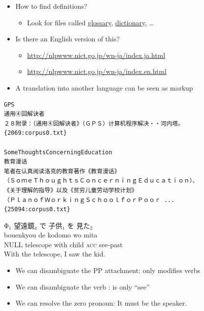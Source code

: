 \documentclass[a4paper,landscape,headrule,footrule,xetex]{foils}
\begin{document}
 \begin{itemize}
 \item How to find definitions?
   \begin{itemize}
   \item Look for files called \url{glossary}, \url{dictionary}, \ldots
   \end{itemize}
 \item Is there an English version of this?
   \begin{itemize}
   \item \url{http://nlpwww.nict.go.jp/wn-ja/index.ja.html}
   \item \url{http://nlpwww.nict.go.jp/wn-ja/index.en.html}
   \end{itemize}
 \end{itemize}


 \begin{itemize}
 \item A translation into another language can be seen as markup
 \end{itemize}

\begin{verbatim}
GPS	
通用④回解诀者
２８附录：（通用④回解诀者》（ＧＰＳ）计算机程序解决・・河内塔。
{2069:corpus0.txt}

SomeThoughtsConcerningEducation	
教育漫话
笔者在认真阅读洛克的教育著作《教育漫话》
（ＳｏｍｅＴｈｏｕｇｈｔｓＣｏｎｃｅｒｎｉｎｇＥｄｕｃａｔｉｏｎ）、
《关于理解的指导》以及《贫穷儿童劳动学校计划》
（ＰｌａｎｏｆＷｏｒｋｉｎｇＳｃｈｏｏｌｆｏｒＰｏｏｒ ...
{25094:corpus0.txt}
\end{verbatim}


\begin{exe}
  \ex {}
  \ex \glll Φ$_1$ 望遠鏡$_4$ で 子供$_1$ を 見た$_2$ \\
  {} bouenkyou de kodomo wo mita \\
 NULL telescope with child \textsc{acc} see-past \\
 \trans With the telescope, I saw the kid.
\end{exe}
\begin{itemize}
\item We can disambiguate the PP attachment:  only modifies verbs
\item We can disambiguate the verb :  is only ``see''
\item We can resolve the zero pronoun: It must be the speaker. 
\end{itemize}
\end{document}
